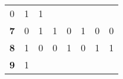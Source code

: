 \documentclass[11pt,english,landscape]{article}
\begin{document}
\begin{multicols}{3}
\begin{tabular}{| c | c | c | c | c | c | c | c |}
		\textcolor{MaterialIndigo}{0}          &                                                                                                
		\textcolor{MaterialPink}{1}            &                                                                                                
		\textcolor{MaterialPink}{1} 
		\\
		\rowcolor{GoogleYellow!20}\bfseries{7} &                                                                                                
		\textcolor{MaterialIndigo}{0}          &                                                                                                
		\textcolor{MaterialPink}{1}            &                                                                                                
		\textcolor{MaterialPink}{1}            &                                                                                                
		\textcolor{MaterialIndigo}{0}          &                                                                                                
		\textcolor{MaterialPink}{1}            &                                                                                                
		\textcolor{MaterialIndigo}{0}          &                                                                                                
		\textcolor{MaterialIndigo}{0} 
		\\
		\rowcolor{GoogleYellow!10}\bfseries{8} &                                                                                                
		\textcolor{MaterialPink}{1}            &                                                                                                
		\textcolor{MaterialIndigo}{0}          &                                                                                                
		\textcolor{MaterialIndigo}{0}          &                                                                                                
		\textcolor{MaterialPink}{1}            &                                                                                                
		\textcolor{MaterialIndigo}{0}          &                                                                                                
		\textcolor{MaterialPink}{1}            &                                                                                                
		\textcolor{MaterialPink}{1}
		\\
		\rowcolor{GoogleYellow!20}\bfseries{9} &                                                                                                
		\textcolor{MaterialPink}{1}            &                                                                                                

\end{tabular}
\end{multicols}
\end{document}
